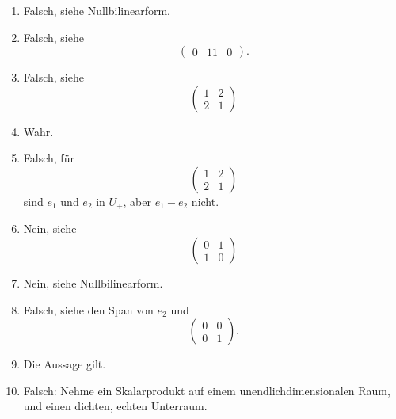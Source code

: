 \documentclass[a4paper,10pt]{scrartcl}
\begin{document}
\begin{solution}
  \begin{enumerate}[leftmargin=*]
    \item
      Falsch, siehe Nullbilinearform.
    \item
      Falsch, siehe
      \[
        \begin{pmatrix}
          0 & 1
          1 & 0
        \end{pmatrix}.
      \]
    \item
      Falsch, siehe
      \[
        \begin{pmatrix}
          1 & 2 \\
          2 & 1
        \end{pmatrix}
      \]
    \item
      Wahr.
    \item
      Falsch, für
      \[
        \begin{pmatrix}
          1 & 2 \\
          2 & 1
        \end{pmatrix}
      \]
      sind $e_1$ und $e_2$ in $U_+$, aber $e_1 - e_2$ nicht.
    \item
      Nein, siehe
      \[
        \begin{pmatrix}
          0 & 1 \\
          1 & 0
        \end{pmatrix}
      \]
    \item
      Nein, siehe Nullbilinearform.
    \item
      Falsch, siehe den Span von $e_2$ und
      \[
        \begin{pmatrix}
          0 & 0 \\
          0 & 1
        \end{pmatrix}.
      \]
    \item
      Die Aussage gilt.
    \item
      Falsch: Nehme ein Skalarprodukt auf einem unendlichdimensionalen Raum, und einen dichten, echten Unterraum.
  \end{enumerate}
\end{solution}
\end{document}
